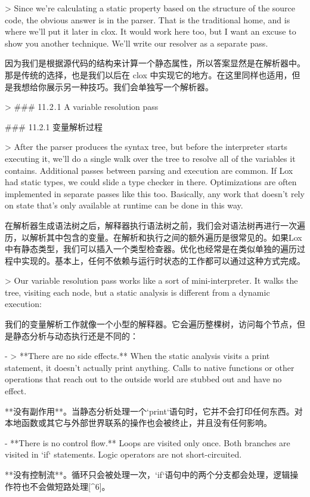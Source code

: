 \documentclass[cn,11pt,chinese]{elegantbook}
\begin{document}
{{{{{{{{{{{{> Since we’re calculating a static property based on the structure of the source code, the obvious answer is in the parser. That is the traditional home, and is where we’ll put it later in clox. It would work here too, but I want an excuse to show you another technique. We’ll write our resolver as a separate pass.

因为我们是根据源代码的结构来计算一个静态属性，所以答案显然是在解析器中。那是传统的选择，也是我们以后在 clox 中实现它的地方。在这里同样也适用，但是我想给你展示另一种技巧。我们会单独写一个解析器。

> ### 11 . 2 . 1 A variable resolution pass

### 11.2.1 变量解析过程

> After the parser produces the syntax tree, but before the interpreter starts executing it, we’ll do a single walk over the tree to resolve all of the variables it contains. Additional passes between parsing and execution are common. If Lox had static types, we could slide a type checker in there. Optimizations are often implemented in separate passes like this too. Basically, any work that doesn’t rely on state that’s only available at runtime can be done in this way.

在解析器生成语法树之后，解释器执行语法树之前，我们会对语法树再进行一次遍历，以解析其中包含的变量。在解析和执行之间的额外遍历是很常见的。如果Lox中有静态类型，我们可以插入一个类型检查器。优化也经常是在类似单独的遍历过程中实现的。基本上，任何不依赖与运行时状态的工作都可以通过这种方式完成。

> Our variable resolution pass works like a sort of mini-interpreter. It walks the tree, visiting each node, but a static analysis is different from a dynamic execution:

我们的变量解析工作就像一个小型的解释器。它会遍历整棵树，访问每个节点，但是静态分析与动态执行还是不同的：

- > **There are no side effects.** When the static analysis visits a print statement, it doesn’t actually print anything. Calls to native functions or other operations that reach out to the outside world are stubbed out and have no effect.

  **没有副作用**。当静态分析处理一个`print`语句时，它并不会打印任何东西。对本地函数或其它与外部世界联系的操作也会被终止，并且没有任何影响。

- **There is no control flow.** Loops are visited only once. Both branches are visited in `if` statements. Logic operators are not short-circuited.

  **没有控制流**。循环只会被处理一次，`if`语句中的两个分支都会处理，逻辑操作符也不会做短路处理[^6]。

}}}}}}}}}}}}
\end{document}
